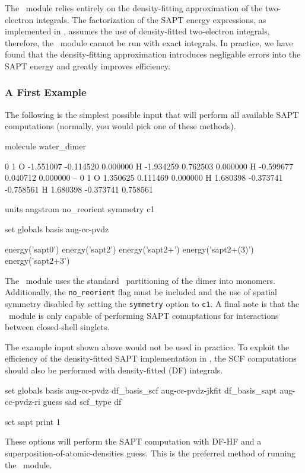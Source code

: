 The \PSIsapt\ module relies entirely on the density-fitting approximation
of the two-electron integrals. The factorization of the SAPT energy
expressions, as implemented in \PSIfour, assumes the use of density-fitted
two-electron integrals, therefore, the \PSIsapt\ module cannot be run with
exact integrals. In practice, we have found that the density-fitting
approximation introduces negligable errors into the SAPT energy and greatly
improves efficiency. 

\subsubsection{A First Example}

The following is the simplest possible input that will perform all
available SAPT computations (normally, you would pick one of these methods).
\begin{Snippet}

molecule water_dimer {
     0 1
     O  -1.551007  -0.114520   0.000000
     H  -1.934259   0.762503   0.000000
     H  -0.599677   0.040712   0.000000
     --
     0 1
     O   1.350625   0.111469   0.000000
     H   1.680398  -0.373741  -0.758561
     H   1.680398  -0.373741   0.758561

     units angstrom
     no_reorient
     symmetry c1
}

set globals {
    basis         aug-cc-pvdz
}

energy('sapt0')
energy('sapt2')
energy('sapt2+')
energy('sapt2+(3)')
energy('sapt2+3')

\end{Snippet}
The \PSIsapt\ module uses the standard \PSIfour\ partitioning of the dimer
into monomers. Additionally, the \texttt{no\_reorient} flag must be included
and the use of spatial symmetry disabled by setting the \texttt{symmetry}
option to \texttt{c1}. A final note is that the \PSIsapt\ module is only 
capable of performing SAPT comuptations for interactions between closed-shell 
singlets. 

The example input shown above would not be used in practice.
To exploit the efficiency of the density-fitted SAPT implementation in
\PSIfour, the SCF computations should also be performed with density-fitted
(DF) integrals.
\begin{Snippet}

set globals {
    basis         aug-cc-pvdz
    df_basis_scf  aug-cc-pvdz-jkfit
    df_basis_sapt aug-cc-pvdz-ri
    guess         sad
    scf_type      df
}

set sapt {
    print         1
}

\end{Snippet}
These options will perform the SAPT computation with DF-HF and a 
superposition-of-atomic-densities guess. This is the preferred method of 
running the \PSIsapt\ module.

